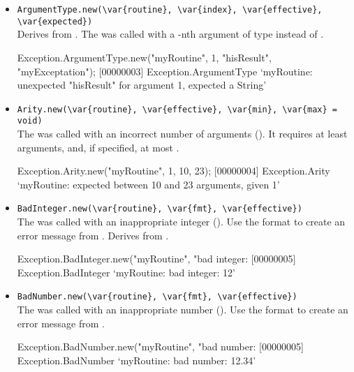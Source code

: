 \begin{itemize}
\item \lstinline|ArgumentType.new(\var{routine}, \var{index}, \var{effective}, \var{expected})|\\
  Derives from .  The  was
  called with a -nth argument of type 
  instead of .
\begin{urbiscript}
Exception.ArgumentType.new("myRoutine", 1, "hisResult", "myExceptation");
[00000003] Exception.ArgumentType `myRoutine: unexpected "hisResult" for argument 1, expected a String'
\end{urbiscript}

\item \lstinline|Arity.new(\var{routine}, \var{effective}, \var{min}, \var{max} = void)|\\
  The  was called with an incorrect number of arguments
  ().  It requires at least  arguments, and,
  if specified, at most .
\begin{urbiscript}
Exception.Arity.new("myRoutine", 1, 10, 23);
[00000004] Exception.Arity `myRoutine: expected between 10 and 23 arguments, given 1'
\end{urbiscript}
\item \lstinline|BadInteger.new(\var{routine}, \var{fmt}, \var{effective})|\\
  The  was called with an inappropriate integer
  ().  Use the format  to create an error
  message from .  Derives from
  .
\begin{urbiscript}
Exception.BadInteger.new("myRoutine", "bad integer: %
[00000005] Exception.BadInteger `myRoutine: bad integer: 12'
\end{urbiscript}

\item \lstinline|BadNumber.new(\var{routine}, \var{fmt}, \var{effective})|\\
  The  was called with an inappropriate number
  ().  Use the format  to create an error
  message from .
\begin{urbiscript}
Exception.BadNumber.new("myRoutine", "bad number: %
[00000005] Exception.BadNumber `myRoutine: bad number: 12.34'
\end{urbiscript}


\end{itemize}
